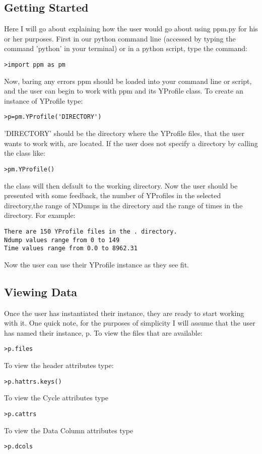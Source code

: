 \subsection{Getting Started}
Here I will go about explaining how the user would go about using ppm.py for his or her purposes.
First in our python command line (accessed by typing the command 'python' in your terminal) or in a python script,
type the command:
\begin{verbatim}
>import ppm as pm
\end{verbatim}
Now, baring any errors ppm should be loaded into your command line or script, and the user can begin
to work with ppm and its YProfile class. To create an instance of YProfile type:
\begin{verbatim}
>p=pm.YProfile('DIRECTORY')
\end{verbatim}
'DIRECTORY' should be the directory where the YProfile files, that the user wants
to work with, are located. If the user does not specify a directory by calling the class
like: 
\begin{verbatim}
>pm.YProfile()
\end{verbatim}
the class will then default to the working directory.
Now the user should be presented with some feedback, the number of YProfiles in the selected 
directory,the range of NDumps in the directory and the range of times in the directory. For example:
\begin{verbatim}
There are 150 YProfile files in the . directory.
Ndump values range from 0 to 149
Time values range from 0.0 to 8962.31
\end{verbatim}
Now the user can use their YProfile instance as they see fit.

\subsection{Viewing Data}
Once the user has instantiated their instance, they are ready to start working with it.
One quick note, for the purposes of simplicity I will assume that the user has named
their instance, p.
\newline
To view the files that are available:
\begin{verbatim}
>p.files
\end{verbatim}
To view the header attributes type:
\begin{verbatim}
>p.hattrs.keys()
\end{verbatim}


To view the Cycle attributes type
\begin{verbatim}
>p.cattrs
\end{verbatim}
To view the Data Column attributes type
\begin{verbatim}
>p.dcols
\end{verbatim}

